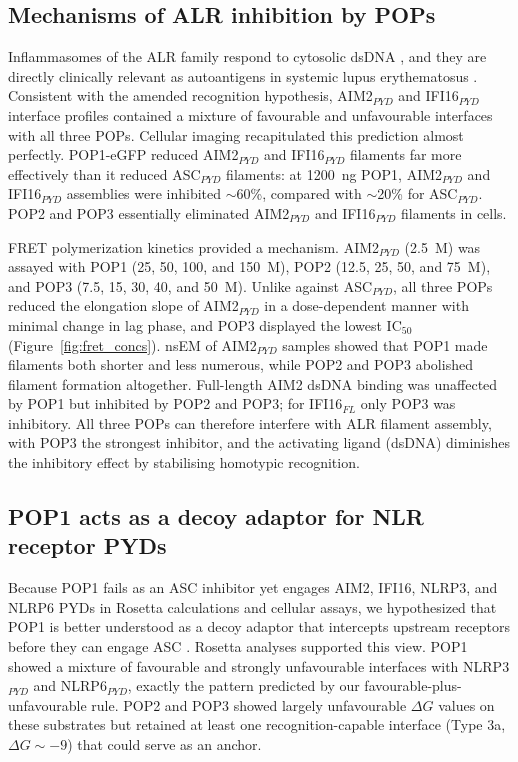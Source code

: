 \documentclass[11pt]{article}
\begin{document}
\subsection{Mechanisms of ALR inhibition by POPs}

Inflammasomes of the ALR family respond to cytosolic dsDNA
\citep{hornung2009aim2, fernandesalnemri2009aim2, roberts2009hin200,
morrone2015assembly}, and they are directly clinically relevant as
autoantigens in systemic lupus erythematosus
\citep{antiochos2022dna, kerur2011ifi16}. Consistent with the amended
recognition hypothesis, AIM2$_{PYD}$ and IFI16$_{PYD}$ interface profiles
contained a mixture of favourable and unfavourable interfaces with all
three POPs. Cellular imaging recapitulated this prediction almost
perfectly. POP1-eGFP reduced AIM2$_{PYD}$ and IFI16$_{PYD}$ filaments far
more effectively than it reduced ASC$_{PYD}$ filaments: at 1200~ng POP1,
AIM2$_{PYD}$ and IFI16$_{PYD}$ assemblies were inhibited $\sim$60\%,
compared with $\sim$20\% for ASC$_{PYD}$. POP2 and POP3 essentially
eliminated AIM2$_{PYD}$ and IFI16$_{PYD}$ filaments in cells.

FRET polymerization kinetics provided a mechanism. AIM2$_{PYD}$
(2.5~\textmu M) was assayed with POP1 (25, 50, 100, and 150~\textmu M),
POP2 (12.5, 25, 50, and 75~\textmu M), and POP3 (7.5, 15, 30, 40, and
50~\textmu M). Unlike against ASC$_{PYD}$, all three POPs reduced the
elongation slope of AIM2$_{PYD}$ in a dose-dependent manner with minimal
change in lag phase, and POP3 displayed the lowest IC$_{50}$
(Figure~\ref{fig:fret_concs}). nsEM of AIM2$_{PYD}$ samples showed that
POP1 made filaments both shorter and less numerous, while POP2 and POP3
abolished filament formation altogether. Full-length AIM2 dsDNA binding
was unaffected by POP1 but inhibited by POP2 and POP3; for IFI16$_{FL}$
only POP3 was inhibitory. All three POPs can therefore interfere with
ALR filament assembly, with POP3 the strongest inhibitor, and the
activating ligand (dsDNA) diminishes the inhibitory effect by stabilising
homotypic recognition.

\subsection{POP1 acts as a decoy adaptor for NLR receptor PYDs}

Because POP1 fails as an ASC inhibitor yet engages AIM2, IFI16, NLRP3,
and NLRP6 PYDs in Rosetta calculations and cellular assays, we
hypothesized that POP1 is better understood as a decoy adaptor that
intercepts upstream receptors before they can engage ASC
\citep{lu2014unified}. Rosetta analyses supported this view. POP1 showed
a mixture of favourable and strongly unfavourable interfaces with
NLRP3$_{PYD}$ and NLRP6$_{PYD}$, exactly the pattern predicted by our
favourable-plus-unfavourable rule. POP2 and POP3 showed largely
unfavourable $\Delta G$ values on these substrates but retained at least
one recognition-capable interface (Type 3a, $\Delta G \sim -9$) that
could serve as an anchor.
\end{document}
